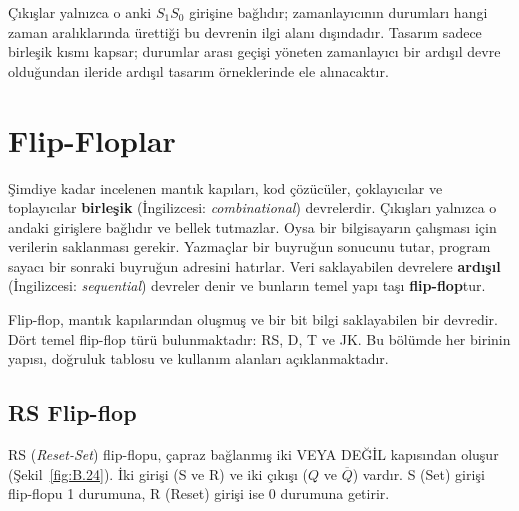 \begin{ornek}[B.13]
\begin{center}
\end{center}

Çıkışlar yalnızca o anki $S_1 S_0$ girişine bağlıdır; zamanlayıcının durumları hangi zaman aralıklarında ürettiği bu devrenin ilgi alanı dışındadır. Tasarım sadece birleşik kısmı kapsar; durumlar arası geçişi yöneten zamanlayıcı bir ardışıl devre olduğundan ileride ardışıl tasarım örneklerinde ele alınacaktır.
\end{ornek}


\section{Flip-Floplar}

Şimdiye kadar incelenen mantık kapıları, kod çözücüler, çoklayıcılar ve toplayıcılar \textbf{birleşik} (İngilizcesi: \textit{combinational}) devrelerdir. Çıkışları yalnızca o andaki girişlere bağlıdır ve bellek tutmazlar. Oysa bir bilgisayarın çalışması için verilerin saklanması gerekir. Yazmaçlar bir buyruğun sonucunu tutar, program sayacı bir sonraki buyruğun adresini hatırlar. Veri saklayabilen devrelere \textbf{ardışıl} (İngilizcesi: \textit{sequential}) devreler denir ve bunların temel yapı taşı \textbf{flip-flop}tur.

Flip-flop, mantık kapılarından oluşmuş ve bir bit bilgi saklayabilen bir devredir. Dört temel flip-flop türü bulunmaktadır: RS, D, T ve JK. Bu bölümde her birinin yapısı, doğruluk tablosu ve kullanım alanları açıklanmaktadır.


\subsection{RS Flip-flop}

RS (\emph{Reset-Set}) flip-flopu, çapraz bağlanmış iki VEYA DEĞİL kapısından oluşur (Şekil~\ref{fig:B.24}). İki girişi (S ve R) ve iki çıkışı ($Q$ ve $\overline{Q}$) vardır. S (Set) girişi flip-flopu 1 durumuna, R (Reset) girişi ise 0 durumuna getirir.

